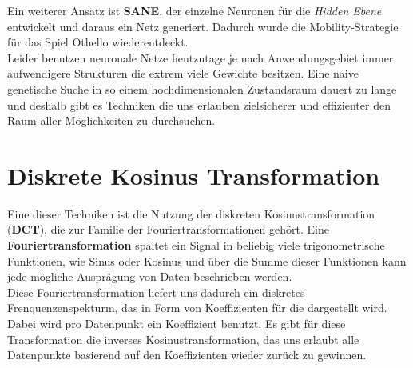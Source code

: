             \noindent
            Ein weiterer Ansatz ist \textbf{SANE}\cite{moriarty1999evolutionary}, der einzelne Neuronen für die \textit{Hidden Ebene} entwickelt und daraus ein Netz generiert. Dadurch wurde die Mobility-Strategie für das Spiel Othello wiederentdeckt. \\

            \noindent
            Leider benutzen neuronale Netze heutzutage je nach Anwendungsgebiet immer aufwendigere Strukturen die extrem viele Gewichte besitzen. Eine naive genetische Suche in so einem hochdimensionalen Zustandsraum dauert zu lange und deshalb gibt es Techniken die uns erlauben zielsicherer und effizienter den Raum aller Möglichkeiten zu durchsuchen.


    \section{Diskrete Kosinus Transformation}

        Eine dieser Techniken ist die Nutzung der diskreten Kosinustransformation (\textbf{DCT}), die zur Familie der Fouriertransformationen gehört. Eine \textbf{Fouriertransformation} spaltet ein Signal in beliebig viele trigonometrische Funktionen, wie Sinus oder Kosinus und über die Summe dieser Funktionen kann jede mögliche Ausprägung von Daten beschrieben werden. \\

        \noindent
        Diese Fouriertransformation liefert uns dadurch ein diskretes Frenquenzenspekturm, das in Form von Koeffizienten für die dargestellt wird. Dabei wird pro Datenpunkt ein Koeffizient benutzt. Es gibt für diese Transformation die inverses Kosinustransformation, das uns erlaubt alle Datenpunkte basierend auf den Koeffizienten wieder zurück zu gewinnen.

